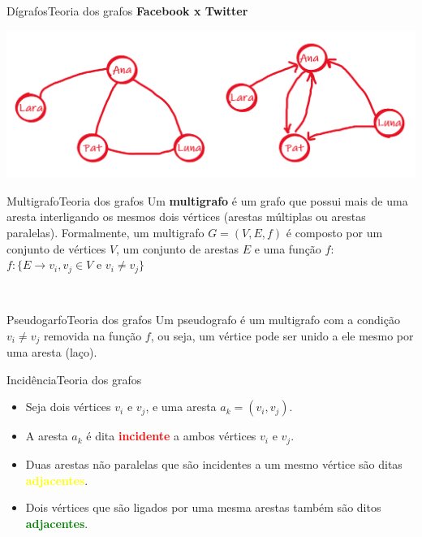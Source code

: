 \documentclass[t]{beamer}
\begin{document}
\begin{ftst}{Dígrafos}{Teoria dos grafos}
\centering
\textbf{Facebook x Twitter}

\vone

\vone
\centering
\includegraphics[scale=0.5]{Figuras/facetwitter.png}\\

\end{ftst}



\begin{ftst}{Multigrafo}{Teoria dos grafos}
\justifying
Um \textbf{multigrafo} é um grafo que possui mais de uma aresta interligando os mesmos dois vértices (arestas múltiplas ou arestas paralelas). 
\vone
Formalmente, um multigrafo $G = (V,E,f)$ é composto por um conjunto de vértices $V$, um conjunto de arestas $E$ e uma função $f$:
\vone
\centering
\huge
$f: \{E \rightarrow v_i, v_j \in V$ e $v_i \neq v_j \}$


\\


\end{ftst}


\begin{ftst}{Pseudogarfo}{Teoria dos grafos}
\justifying
Um pseudografo é um multigrafo com a condição $v_i \neq v_j$ removida na função $f$, ou seja, um vértice pode ser unido a ele mesmo por uma aresta (laço).
\vone
\vone
\centering
\\


\end{ftst}


\begin{ftst}{Incidência}{Teoria dos grafos}
\justifying
\begin{itemize}
    \item Seja dois vértices $v_i$ e $v_j$, e uma aresta $a_k = (v_i,v_j)$.
    \item A aresta $a_k$ é dita \textcolor{red}{\textbf{incidente}} a ambos vértices $v_i$ e $v_j$.
    \item Duas arestas não paralelas que são incidentes a um mesmo vértice são ditas \textcolor{yellow}{\textbf{adjacentes}}.
    \item Dois vértices que são ligados por uma mesma arestas também são ditos \textcolor{green}{\textbf{adjacentes}}. 
\end{itemize}
\vone
\vone
\centering
\\


\end{ftst}
\end{document}
